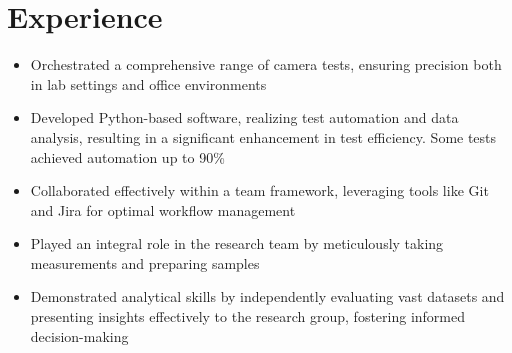 \documentclass[11pt,a4paper,sans]{moderncv}
\begin{document}
\section{Experience}
{
    \begin{itemize}
    \item Orchestrated a comprehensive range of camera tests, ensuring precision both in lab settings and office environments
    \item Developed Python-based software, realizing test automation and data analysis, resulting in a significant enhancement in test efficiency. Some tests achieved automation up to 90\%
    \item Collaborated effectively within a team framework, leveraging tools like Git and Jira for optimal workflow management 
    \end{itemize}
}
{
    \begin{itemize}
    \item Played an integral role in the research team by meticulously taking measurements and preparing samples
    \item Demonstrated analytical skills by independently evaluating vast datasets and presenting insights effectively to the research group, fostering informed decision-making
    \end{itemize}
}

\end{document}
